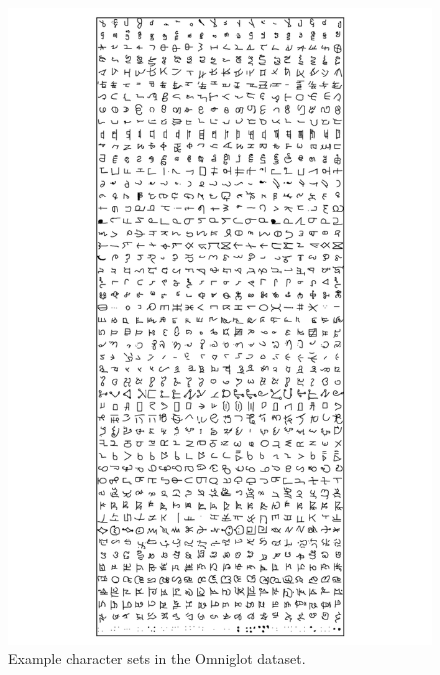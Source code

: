 \documentclass{article}
\begin{document}
\begin{figure}[h!]
\begin{center}
\includegraphics[width=\columnwidth, clip, trim=5cm 23cm 5cm 1cm]{../experiments/Feb_1_learning_alphabet_corr/5/all_alphabets.png}
\caption{Example character sets in the Omniglot dataset.}
\label{fig:omniglot}
\end{center}
\end{figure} 
\end{document}
